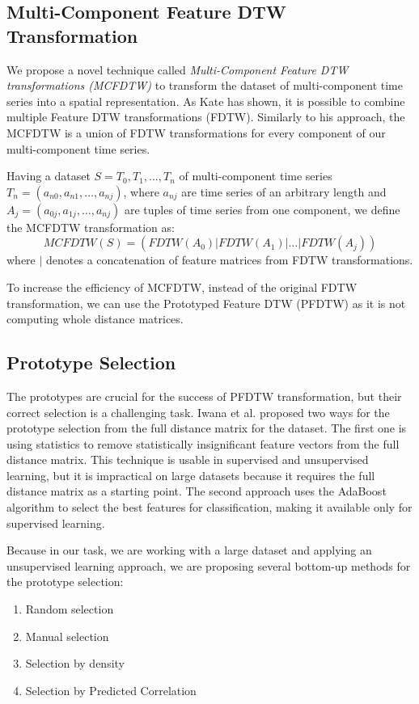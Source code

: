 \subsection{Multi-Component Feature DTW Transformation}
We propose a novel technique called \textit{Multi-Component Feature DTW transformations (MCFDTW)} to transform the dataset of multi-component time series into a spatial representation. As Kate \cite{met:fDTW} has shown, it is possible to combine multiple Feature DTW transformations (FDTW). Similarly to his approach, the MCFDTW is a union of FDTW transformations for every component  of our multi-component time series.

Having a dataset $S = {T_0, T_1, \dots, T_n}$ of multi-component time series $T_n = (a_{n0}, a_{n1}, \dots, a_{nj})$, where $a_{nj}$ are time series of an arbitrary length and $A_j = (a_{0j}, a_{1j}, \dots, a_{nj})$ are tuples of time series from one component, we define the MCFDTW transformation as:
\begin{equation}
 MCFDTW(S) = ( FDTW(A_{0}) | FDTW(A_{1}) | \dots | FDTW(A_{j}) )
\end{equation}
where $|$ denotes a concatenation of feature matrices from FDTW transformations.

To increase the efficiency of MCFDTW, instead of the original FDTW transformation, we can use the Prototyped Feature DTW (PFDTW) as it is not computing whole distance matrices.

\subsection{Prototype Selection}
The prototypes are crucial for the success of PFDTW transformation, but their correct selection is a challenging task. Iwana et al. \cite{met:protofDTW} proposed two ways for the prototype selection from the full distance matrix for the dataset. The first one is using statistics to remove statistically insignificant feature vectors from the full distance matrix. This technique is usable in supervised and unsupervised learning, but it is impractical on large datasets because it requires the full distance matrix as a starting point. The second approach uses the AdaBoost algorithm to select the best features for classification, making it available only for supervised learning.

Because in our task, we are working with a large dataset and applying an unsupervised learning approach, we  are proposing several bottom-up methods for the prototype selection:
\begin{enumerate}
    \item Random selection
    \item Manual selection
    \item Selection by density
    \item Selection by Predicted Correlation
\end{enumerate}

